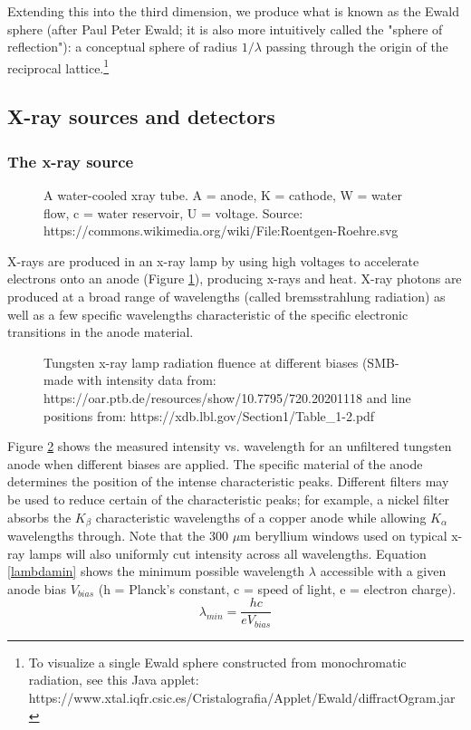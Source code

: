 Extending this into the third dimension, we produce what is known as the Ewald sphere (after Paul Peter Ewald; it is also more intuitively called the "sphere of reflection"): a conceptual sphere of radius $1/\lambda$ passing through the origin of the reciprocal lattice.\footnote{To visualize a single Ewald sphere constructed from monochromatic radiation, see this Java applet: https://www.xtal.iqfr.csic.es/Cristalografia/Applet/Ewald/diffractOgram.jar}

\subsection{X-ray sources and detectors}
\subsubsection{The x-ray source}
\begin{figure}[htbp]
  \centering
  
  \caption{A water-cooled xray tube. A = anode, K = cathode, W = water flow, c = water reservoir, U = voltage. Source: https://commons.wikimedia.org/wiki/File:Roentgen-Roehre.svg}
  \label{xraysource}
\end{figure}
X-rays are produced in an x-ray lamp by using high voltages to accelerate electrons onto an anode (Figure \ref{xraysource}), producing x-rays and heat. X-ray photons are produced at a broad range of wavelengths (called bremsstrahlung radiation) as well as a few specific wavelengths characteristic of the specific electronic transitions in the anode material.

\begin{figure}[htbp]
  \centering
  
  \caption{Tungsten x-ray lamp radiation fluence at different biases (SMB-made with intensity data from: https://oar.ptb.de/resources/show/10.7795/720.20201118 and line positions from: https://xdb.lbl.gov/Section1/Table_1-2.pdf}
  \label{Wradiation}
\end{figure}
Figure \ref{Wradiation} shows the measured intensity vs. wavelength for an unfiltered tungsten anode when different biases are applied. The specific material of the anode determines the position of the intense characteristic peaks. Different filters may be used to reduce certain of the characteristic peaks; for example, a nickel filter absorbs the $K_\beta$ characteristic wavelengths of a copper anode while allowing $K_\alpha$ wavelengths through. Note that the 300 $\mu$m beryllium windows used on typical x-ray lamps will also uniformly cut intensity across all wavelengths. Equation \ref{lambdamin} shows the minimum possible wavelength $\lambda$ accessible with a given anode bias $V_{bias}$ (h = Planck’s constant, c = speed of light, e = electron charge). 
\begin{equation}
    \lambda_{min} = \frac{hc}{eV_{bias} }
    \label{lambdamin}
\end{equation}

